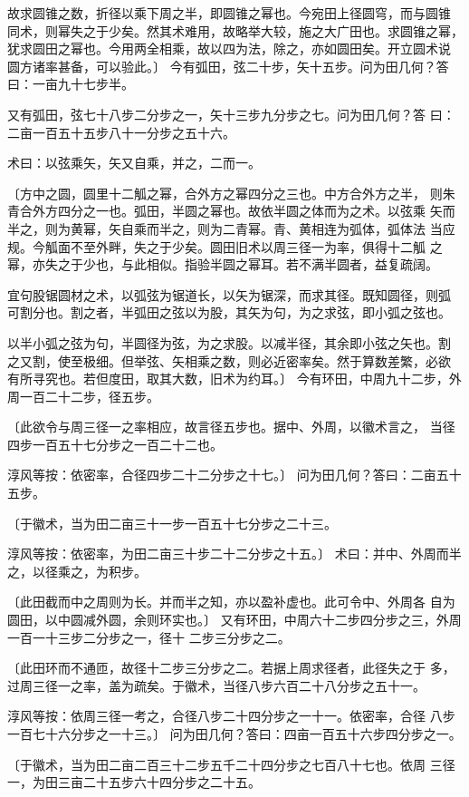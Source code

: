 \documentclass[a4paper,12pt,UTF8,twoside]{ctexbook}
\begin{document}
故求圆锥之数，折径以乘下周之半，即圆锥之幂也。今宛田上径圆穹，而与圆锥 同术，则幂失之于少矣。然其术难用，故略举大较，施之大广田也。求圆锥之幂， 犹求圆田之幂也。今用两全相乘，故以四为法，除之，亦如圆田矣。开立圆术说 圆方诸率甚备，可以验此。〕 今有弧田，弦二十步，矢十五步。问为田几何？答曰：一亩九十七步半。

又有弧田，弦七十八步二分步之一，矢十三步九分步之七。问为田几何？答 曰：二亩一百五十五步八十一分步之五十六。

术曰：以弦乘矢，矢又自乘，并之，二而一。

〔方中之圆，圆里十二觚之幂，合外方之幂四分之三也。中方合外方之半， 则朱青合外方四分之一也。弧田，半圆之幂也。故依半圆之体而为之术。以弦乘 矢而半之，则为黄幂，矢自乘而半之，则为二青幂。青、黄相连为弧体，弧体法 当应规。今觚面不至外畔，失之于少矣。圆田旧术以周三径一为率，俱得十二觚 之幂，亦失之于少也，与此相似。指验半圆之幂耳。若不满半圆者，益复疏阔。

宜句股锯圆材之术，以弧弦为锯道长，以矢为锯深，而求其径。既知圆径，则弧 可割分也。割之者，半弧田之弦以为股，其矢为句，为之求弦，即小弧之弦也。

以半小弧之弦为句，半圆径为弦，为之求股。以减半径，其余即小弦之矢也。割 之又割，使至极细。但举弦、矢相乘之数，则必近密率矣。然于算数差繁，必欲 有所寻究也。若但度田，取其大数，旧术为约耳。〕 今有环田，中周九十二步，外周一百二十二步，径五步。

〔此欲令与周三径一之率相应，故言径五步也。据中、外周，以徽术言之， 当径四步一百五十七分步之一百二十二也。

淳风等按：依密率，合径四步二十二分步之十七。〕 问为田几何？答曰：二亩五十五步。

〔于徽术，当为田二亩三十一步一百五十七分步之二十三。

淳风等按：依密率，为田二亩三十步二十二分步之十五。〕 术曰：并中、外周而半之，以径乘之，为积步。

〔此田截而中之周则为长。并而半之知，亦以盈补虚也。此可令中、外周各 自为圆田，以中圆减外圆，余则环实也。〕 又有环田，中周六十二步四分步之三，外周一百一十三步二分步之一，径十 二步三分步之二。

〔此田环而不通匝，故径十二步三分步之二。若据上周求径者，此径失之于 多，过周三径一之率，盖为疏矣。于徽术，当径八步六百二十八分步之五十一。

淳风等按：依周三径一考之，合径八步二十四分步之一十一。依密率，合径 八步一百七十六分步之一十三。〕 问为田几何？答曰：四亩一百五十六步四分步之一。

〔于徽术，当为田二亩二百三十二步五千二十四分步之七百八十七也。依周 三径一，为田三亩二十五步六十四分步之二十五。
\end{document}
